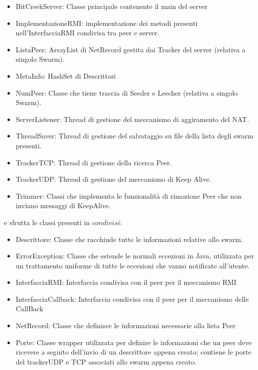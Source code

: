 \begin{itemize}
\item BitCreekServer: Classe principale contenente il main del server
\item ImplementazioneRMI: implementazione dei metodi presenti nell'InterfacciaRMI condivisa tra peer e server.
\item ListaPeer: ArrayList di NetRecord gestita dai Tracker del server (relativa a singolo Swarm).
\item MetaInfo: HashSet di Descrittori
\item NumPeer: Classe che tiene traccia di Seeder e Leecher (relativa a singolo Swarm).
\item ServerListener: Thread di gestione del meccanismo di aggiramento del NAT.
\item ThreadSaver: Thread di gestione del salvataggio su file della lista degli swarm presenti.
\item TrackerTCP: Thread di gestione della ricerca Peer.
\item TrackerUDP: Thread di gestione del meccanismo di Keep Alive.
\item Trimmer: Classi che implementa le funzionalit\`a di rimozione Peer che non inviano messaggi di KeepAlive.
\end{itemize}

e sfrutta le classi presenti in $condivisi$:

\begin{itemize}
\item Descrittore: Classe che racchiude tutte le informazioni relative allo swarm.
\item ErrorException: Classe che estende le normali eccezioni in Java, utilizzata per un trattamento uniforme di tutte le eccezioni che vanno notificate all'utente.
\item InterfacciaRMI: Interfaccia condivisa con il peer per il meccanismo RMI
\item InterfacciaCallback: Interfaccia condivisa con il peer per il meccanismo delle CallBack
\item NetRecord: Classe che definisce le informazioni necessarie alla lista Peer
\item Porte: Classe wrapper utilizzata per definire le informazioni che un peer deve ricevere a seguito dell'invio di un descrittore appena creato; contiene le porte del trackerUDP e TCP associati allo swarm appena creato.
\end{itemize}


